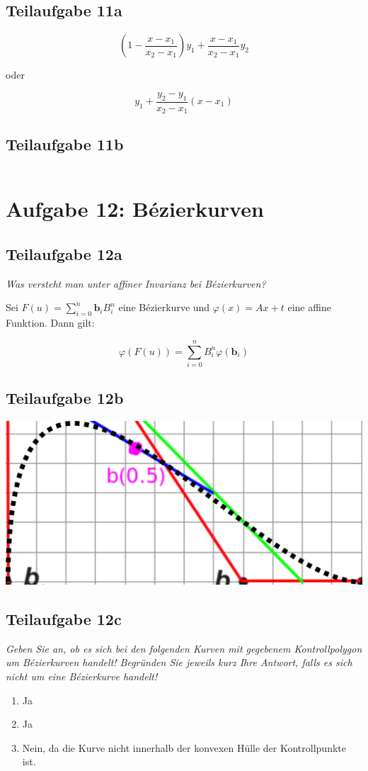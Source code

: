 \documentclass[a4paper]{scrartcl}
\begin{document}
\subsection*{Teilaufgabe 11a}

\[
	\left(1 - \frac{x - x_1}{x_2 - x_1}\right) y_1 + \frac{x - x_1}{x_2 - x_1} y_2
\]

oder

\[
	y_1 + \frac{y_2 - y_1}{x_2 - x_1} (x - x_1)
\]

\clearpage
\subsection*{Teilaufgabe 11b}
\inputminted[linenos, numbersep=5pt, tabsize=4, frame=lines, label=shader.frag]{glsl}{hatching.frag}

\clearpage
\section*{Aufgabe 12: Bézierkurven}
\subsection*{Teilaufgabe 12a}
\textit{Was versteht man unter affiner Invarianz bei Bézierkurven?}

Sei $F(u) = \sum_{i=0}^n \mathbf{b}_i B_i^n$ eine Bézierkurve und
$\varphi(x) = A x + t$ eine affine Funktion. Dann gilt:

\[\varphi(F(u)) = \sum_{i=0}^n B_i^n \varphi(\mathbf{b}_i)\]

\subsection*{Teilaufgabe 12b}
\includegraphics*[width=\linewidth, keepaspectratio]{12b.png}

\subsection*{Teilaufgabe 12c}
\textit{Geben Sie an, ob es sich bei den folgenden Kurven mit gegebenem
Kontrollpolygon um Bézierkurven handelt! Begründen Sie jeweils kurz Ihre
Antwort, falls es sich nicht um eine Bézierkurve handelt!}
\begin{enumerate}
    \item Ja
    \item Ja
    \item Nein, da die Kurve nicht innerhalb der konvexen Hülle der
          Kontrollpunkte ist.
\end{enumerate}
\end{document}
